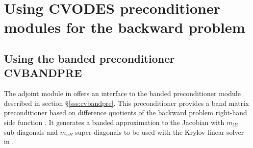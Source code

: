 \section{Using CVODES preconditioner modules for the backward problem}

\subsection{Using the banded preconditioner CVBANDPRE}

The adjoint module in {\cvodes} offers an interface to the banded 
preconditioner module {\cvbandpre} described in section \S\ref{sss:cvbandpre}.
This preconditioner provides a band matrix preconditioner based on difference
quotients of the backward problem right-hand side function . It generates
a banded approximation to the Jacobian with $m_{lB}$ sub-diagonals and $m_{uB}$
super-diagonals to be used with the Krylov linear solver in {\cvspgmr}.

